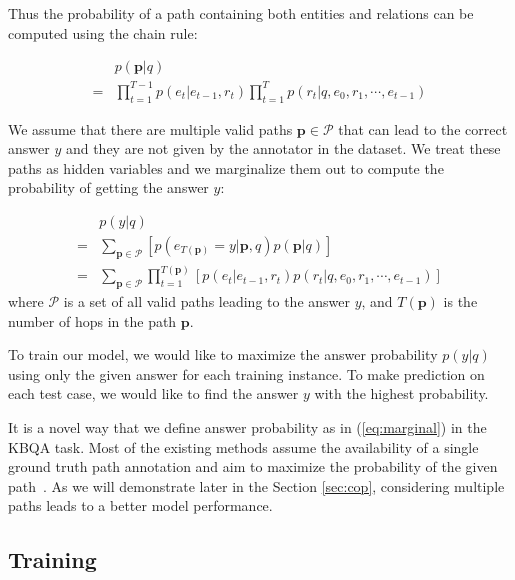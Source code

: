 Thus the probability of a path containing both entities and relations can be computed using the chain rule:

\begin{align}
&p(\mathbf{p}|q)\nonumber\\
=& \prod_{t=1}^{T-1}p(e_t|e_{t-1},r_t)\prod_{t=1}^{T}p(r_t|q,e_0,r_1,\cdots,e_{t-1}) 
\end{align}


We assume that there are multiple valid paths $\mathbf{p}\in \mathcal{P}$ that can lead to the correct answer $y$ and they are not given by the annotator in the dataset. We treat these paths as hidden variables and we marginalize them out to compute the probability of getting the answer $y$:

\begin{align}
&p(y|q)\nonumber\\
=&\sum_{\mathbf{p}\in\mathcal{P}} [p(e_{T(\mathbf{p})}=y|\mathbf{p},q)p(\mathbf{p}|q)] \nonumber\\
=&\sum_{\mathbf{p}\in\mathcal{P}}\prod_{t=1}^{T(\mathbf{p})} [p(e_t|e_{t-1},r_t) p(r_t|q,e_0,r_1,\cdots,e_{t-1})]
\label{eq:marginal}
\end{align}
where $\mathcal{P}$ is a set of all valid paths leading to the answer $y$, and $T(\mathbf{p})$ is the number of hops in the path $\mathbf{p}$.

To train our model, we would like to maximize the answer probability $p(y|q)$ using only the given answer for each training instance. To make prediction on each test case, we would like to find the answer $y$ with the highest probability.

It is a novel way that we define answer probability as in (\ref{eq:marginal}) in the KBQA task. Most of the existing methods assume the availability of a single ground truth path annotation and aim to maximize the probability of the given path~\cite{DBLP:conf/coling/ZhouHZ18}. As we will demonstrate later in the Section \ref{sec:cop}, considering multiple paths leads to a better model performance.











\subsection{Training}


